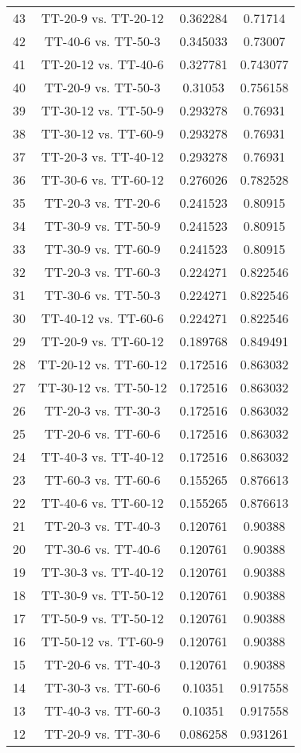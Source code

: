 \documentclass[a4paper,10pt]{article}
\begin{document}
\begin{landscape}
\begin{table}[!htp]
\begin{tabular}{cccc}
43&TT-20-9 vs. TT-20-12&0.362284&0.71714\\
42&TT-40-6 vs. TT-50-3&0.345033&0.73007\\
41&TT-20-12 vs. TT-40-6&0.327781&0.743077\\
40&TT-20-9 vs. TT-50-3&0.31053&0.756158\\
39&TT-30-12 vs. TT-50-9&0.293278&0.76931\\
38&TT-30-12 vs. TT-60-9&0.293278&0.76931\\
37&TT-20-3 vs. TT-40-12&0.293278&0.76931\\
36&TT-30-6 vs. TT-60-12&0.276026&0.782528\\
35&TT-20-3 vs. TT-20-6&0.241523&0.80915\\
34&TT-30-9 vs. TT-50-9&0.241523&0.80915\\
33&TT-30-9 vs. TT-60-9&0.241523&0.80915\\
32&TT-20-3 vs. TT-60-3&0.224271&0.822546\\
31&TT-30-6 vs. TT-50-3&0.224271&0.822546\\
30&TT-40-12 vs. TT-60-6&0.224271&0.822546\\
29&TT-20-9 vs. TT-60-12&0.189768&0.849491\\
28&TT-20-12 vs. TT-60-12&0.172516&0.863032\\
27&TT-30-12 vs. TT-50-12&0.172516&0.863032\\
26&TT-20-3 vs. TT-30-3&0.172516&0.863032\\
25&TT-20-6 vs. TT-60-6&0.172516&0.863032\\
24&TT-40-3 vs. TT-40-12&0.172516&0.863032\\
23&TT-60-3 vs. TT-60-6&0.155265&0.876613\\
22&TT-40-6 vs. TT-60-12&0.155265&0.876613\\
21&TT-20-3 vs. TT-40-3&0.120761&0.90388\\
20&TT-30-6 vs. TT-40-6&0.120761&0.90388\\
19&TT-30-3 vs. TT-40-12&0.120761&0.90388\\
18&TT-30-9 vs. TT-50-12&0.120761&0.90388\\
17&TT-50-9 vs. TT-50-12&0.120761&0.90388\\
16&TT-50-12 vs. TT-60-9&0.120761&0.90388\\
15&TT-20-6 vs. TT-40-3&0.120761&0.90388\\
14&TT-30-3 vs. TT-60-6&0.10351&0.917558\\
13&TT-40-3 vs. TT-60-3&0.10351&0.917558\\
12&TT-20-9 vs. TT-30-6&0.086258&0.931261\\

\end{tabular}
\end{table}
\end{landscape}
\end{document}
